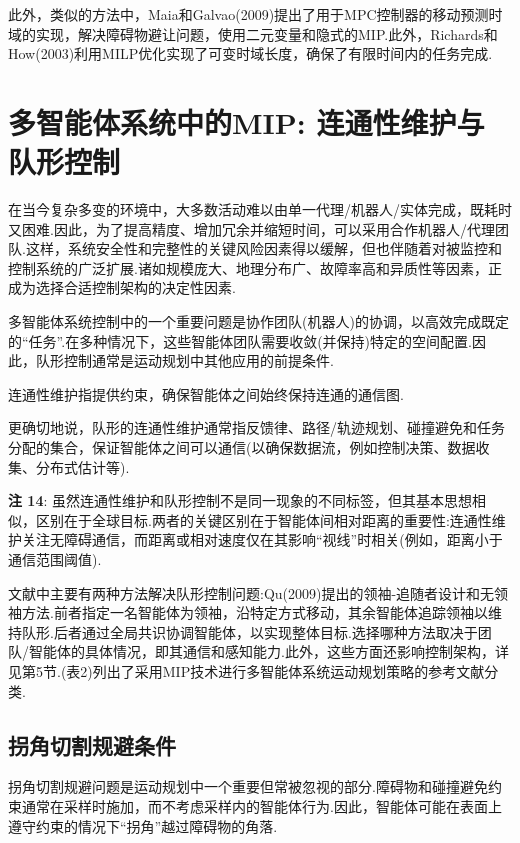 \documentclass[10pt]{article}
\begin{document}
此外，类似的方法中，Maia和Galvao(2009)提出了用于MPC控制器的移动预测时域的实现，解决障碍物避让问题，使用二元变量和隐式的MIP.此外，Richards和How(2003)利用MILP优化实现了可变时域长度，确保了有限时间内的任务完成.

\section{多智能体系统中的MIP: 连通性维护与队形控制}

在当今复杂多变的环境中，大多数活动难以由单一代理/机器人/实体完成，既耗时又困难.因此，为了提高精度、增加冗余并缩短时间，可以采用合作机器人/代理团队.这样，系统安全性和完整性的关键风险因素得以缓解，但也伴随着对被监控和控制系统的广泛扩展.诸如规模庞大、地理分布广、故障率高和异质性等因素，正成为选择合适控制架构的决定性因素.

多智能体系统控制中的一个重要问题是协作团队(机器人)的协调，以高效完成既定的“任务”.在多种情况下，这些智能体团队需要收敛(并保持)特定的空间配置.因此，队形控制通常是运动规划中其他应用的前提条件.

连通性维护指提供约束，确保智能体之间始终保持连通的通信图.

更确切地说，队形的连通性维护通常指反馈律、路径/轨迹规划、碰撞避免和任务分配的集合，保证智能体之间可以通信(以确保数据流，例如控制决策、数据收集、分布式估计等).

\vspace{1 em}
\noindent\textbf{注 14}: 虽然连通性维护和队形控制不是同一现象的不同标签，但其基本思想相似，区别在于全球目标.两者的关键区别在于智能体间相对距离的重要性:连通性维护关注无障碍通信，而距离或相对速度仅在其影响“视线”时相关(例如，距离小于通信范围阈值).
\vspace{1 em}


文献中主要有两种方法解决队形控制问题:Qu(2009)提出的领袖-追随者设计和无领袖方法.前者指定一名智能体为领袖，沿特定方式移动，其余智能体追踪领袖以维持队形.后者通过全局共识协调智能体，以实现整体目标.选择哪种方法取决于团队/智能体的具体情况，即其通信和感知能力.此外，这些方面还影响控制架构，详见第5节.(表2)列出了采用MIP技术进行多智能体系统运动规划策略的参考文献分类.

\subsection{拐角切割规避条件}

拐角切割规避问题是运动规划中一个重要但常被忽视的部分.障碍物和碰撞避免约束通常在采样时施加，而不考虑采样内的智能体行为.因此，智能体可能在表面上遵守约束的情况下“拐角”越过障碍物的角落.
\end{document}
